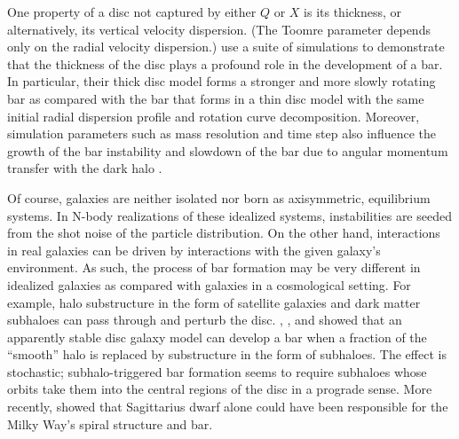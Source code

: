 One property of a disc not captured by either $Q$ or $X$ is its
thickness, or alternatively, its vertical velocity dispersion.  (The
Toomre parameter depends only on the radial velocity dispersion.)
\citet{Klypin2009} use a suite of simulations to demonstrate that the
thickness of the disc plays a profound role in the development of a
bar.  In particular, their thick disc model forms a stronger and more
slowly rotating bar as compared with the bar that forms in a thin disc
model with the same initial radial dispersion profile and rotation
curve decomposition.  Moreover, simulation parameters such as mass
resolution and time step also influence the growth of the bar
instability and slowdown of the bar due to angular momentum transfer
with the dark halo \citep{dbs2009}.

Of course, galaxies are neither isolated nor born as axisymmetric,
equilibrium systems. 
{In N-body realizations of these idealized systems, instabilities
are seeded from the shot noise of the particle distribution. On the other
hand, interactions in real galaxies can be driven by interactions
with the given galaxy's environment. As such, the process of} bar formation may be very different in idealized
galaxies as compared with galaxies in a cosmological setting.  For
example, halo substructure in the form of satellite galaxies and dark
matter subhaloes can pass through and perturb the disc.
\citet{gauthier2006}, \citet{kazantzidis2008}, and
\citet{dbs2009} showed that an apparently stable disc galaxy
model can develop a bar when a fraction of the ``smooth'' halo is
replaced by substructure in the form of subhaloes.  The effect is
stochastic; subhalo-triggered bar formation seems to require subhaloes
whose orbits take them into the central regions of the disc in a
prograde sense.  More recently, \citet{purcell2011} showed that
Sagittarius dwarf alone could have been responsible for the Milky
Way's spiral structure and bar.

